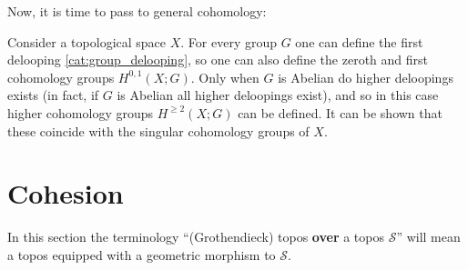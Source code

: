     Now, it is time to pass to general cohomology:
    \begin{example}
        Consider a topological space $X$. For every group $G$ one can define the first delooping \ref{cat:group_delooping}, so one can also define the zeroth and first cohomology groups $H^{0,1}(X;G)$. Only when $G$ is Abelian do higher deloopings exists (in fact, if $G$ is Abelian all higher deloopings exist), and so in this case higher cohomology groups $H^{\geq 2}(X;G)$ can be defined. It can be shown that these coincide with the singular cohomology groups of $X$.
    \end{example}

\section{Cohesion}

    In this section the terminology ``(Grothendieck) topos \textbf{over} a topos $\mathcal{S}$'' will mean a topos equipped with a geometric morphism to $\mathcal{S}$.

